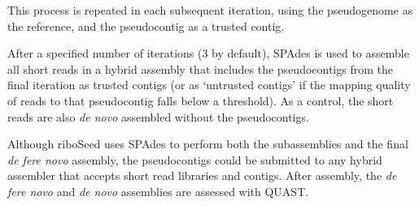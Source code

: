 \documentclass[11pt]{article}
\begin{document}
\begin{linenumbers}
This process is repeated in each subsequent iteration, using the pseudogenome as the reference, and the pseudocontig as a trusted contig.


After a specified number of iterations (3 by default), SPAdes is used to assemble all short reads in a hybrid assembly that includes the pseudocontigs from the final iteration as trusted contigs (or as ‘untrusted contigs’ if the mapping quality of reads to that pseudocontig falls below a threshold). As a control, the short reads are also \textit{de novo} assembled without the pseudocontigs.


Although riboSeed uses SPAdes to perform both the subassemblies and the final \textit{de fere novo} assembly, the pseudocontigs could be submitted to any hybrid assembler that accepts short read libraries and contigs. After assembly, the \textit{de fere novo} and \textit{de novo} assemblies are assessed with QUAST\cite{Gurevich2013}.


\end{linenumbers}
\end{document}

